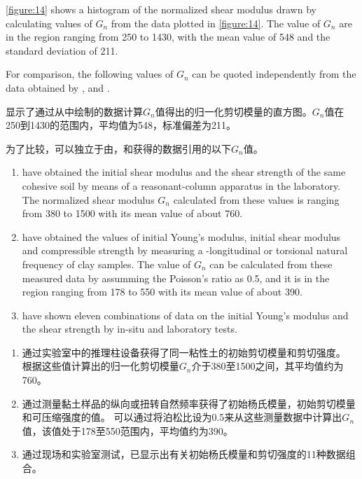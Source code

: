 \begin{paracol}{2}
    
    \autoref{figure:14} shows a histogram of the normalized shear modulus drawn by calculating values of $G_n$ from the data plotted in \autoref{figure:14}. The value of $G_n$ are in the region ranging from 250 to 1430, with the mean value of 548 and the standard deviation of 211.
    
    For comparison, the following values of $G_n$ can be quoted independently from the data obtained by \citet{Hardin1973667}, \citet{Wilson2010419} and \citet{DAppolonia19711359}.

    \switchcolumn

    显示了通过从中绘制的数据计算$G_n$值得出的归一化剪切模量的直方图。$G_n$值在250到1430的范围内，平均值为548，标准偏差为211。
    
    为了比较，可以独立于由\citet{Hardin1973667}，\citet{Wilson2010419}和\citet{DAppolonia19711359}获得的数据引用的以下$G_n$值。

    \switchcolumn*
    
    \begin{enumerate}
        \item \citet{Hardin1973667} have obtained the initial shear modulus and the shear strength of the same cohesive soil by means of a reasonant-column apparatus in the laboratory. The normalized shear modulus $G_n$ calculated from these values is ranging from 380 to 1500 with its mean value of about 760.
        \item \citet{Wilson2010419} have obtained the values of initial Young's modulus, initial shear modulus and compressible strength by measuring a -longitudinal or torsional natural frequency of clay samples. The value of $G_n$ can be calculated from these measured data by assumming the Poisson's ratio as 0.5, and it is in the region ranging from 178 to 550 with its mean value of about 390.
        \item \citet{DAppolonia19711359} have shown eleven combinations of data on the initial Young's modulus and the shear strength by in-situ and laboratory tests. 
    \end{enumerate}      

    \switchcolumn
    
    \begin{enumerate}         
        \item \citet{Hardin1973667}通过实验室中的推理柱设备获得了同一粘性土的初始剪切模量和剪切强度。 根据这些值计算出的归一化剪切模量$G_n$介于380至1500之间，其平均值约为760。
        \item \citet{Wilson2010419}通过测量黏土样品的纵向或扭转自然频率获得了初始杨氏模量，初始剪切模量和可压缩强度的值。 可以通过将泊松比设为0.5来从这些测量数据中计算出$G_n$值，该值处于178至550范围内，平均值约为390。
        \item \citet{DAppolonia19711359}通过现场和实验室测试，已显示出有关初始杨氏模量和剪切强度的11种数据组合。
    \end{enumerate}


\end{paracol}
